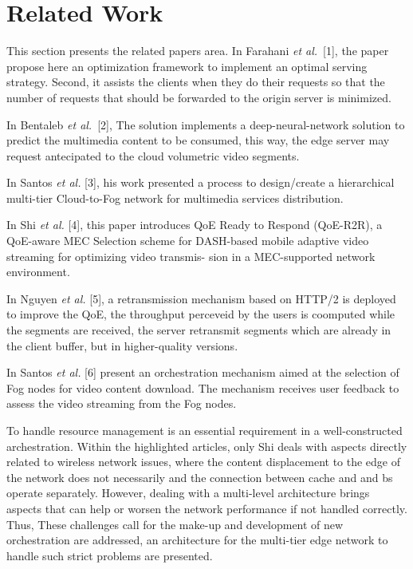 \section{Related Work}


This section presents the related papers area.
In Farahani \textit{et al.}~[1], the paper propose here an optimization framework to implement an optimal serving strategy. Second, it assists the clients when they do their requests so that the number of requests that should be forwarded to the origin server is minimized.

In Bentaleb \textit{et al.}~[2], The solution implements a deep-neural-network solution to predict  the multimedia content to be consumed, this way, the edge server may request antecipated to the cloud volumetric video segments.

In Santos \textit{et al.} [3], his work presented a process to design/create a hierarchical multi-tier Cloud-to-Fog network for multimedia services distribution.

In Shi \textit{et al.} [4], this paper introduces QoE Ready to Respond (QoE-R2R), a QoE-aware MEC Selection scheme for DASH-based mobile adaptive video streaming for optimizing video transmis- sion in a MEC-supported network environment.

In Nguyen \textit{et al.} [5], a retransmission mechanism based on  HTTP/2 is deployed to improve the QoE, the throughput perceveid by the users is coomputed while the segments are received, the server retransmit segments which are already in the client buffer, but in higher-quality versions.

In Santos \textit{et al.} [6] present an orchestration mechanism aimed at the selection of Fog nodes for video content download. The mechanism receives user feedback to assess the video streaming from the Fog nodes.

To handle resource management is an essential requirement in a well-constructed archestration. Within the highlighted articles, only Shi deals with aspects directly related to wireless network issues, where the content displacement to the edge of the network does not necessarily and the connection between cache and and bs operate separately. However, dealing with a multi-level architecture brings aspects that can help or worsen the network performance if not handled correctly. Thus, These challenges call for the make-up and development of new orchestration are addressed, an architecture for the multi-tier edge network to handle such strict problems are presented.